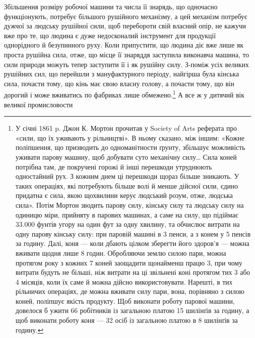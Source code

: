 Збільшення розміру робочої машини та числа її знарядь,
що одночасно функціонують, потребує більшого рушійного механізму,
а цей механізм потребує дужчої за людську рушійної сили,
щоб перебороти свій власний опір, не кажучи вже про те, що
людина є дуже недосконалий інструмент для продукції однорідного
й безупинного руху. Коли припустити, що людина діє
вже лише як проста рушійна сила, отже, що місце її знаряддя
заступила виконавча машина, то сили природи можуть тепер
заступити її і як рушійну силу. З-поміж усіх великих рушійних
сил, що перейшли з мануфактурного періоду, найгірша була
кінська сила, почасти тому, що кінь має свою власну голову,
а почасти тому, що він дорогий і може вживатись по фабриках
лише обмежено.\footnote{
У січні 1861 p. Джон К. Мортон прочитав у Society of Arts реферата
про «сили, що їх уживають у рільництві». В ньому сказано, між
іншим: «Кожне поліпшення, що призводить до одноманітности ґрунту,
збільшує можливість уживати парову машину, щоб добувати суто механічну
силу\dots{} Сила коней потрібна там, де покручені горожі й інші перешкоди
утруднюють одностайний рух. З кожним днем ці перешкоди щораз
більше зникають. У таких операціях, які потребують більше волі й менше
дійсної сили, єдино придатна є сила, якою щохвилини керує людський
розум, отже, людська сила». Потім Мортон зводить парову силу, кінську
силу та людську силу на одиницю міри, прийняту в парових машинах,
а саме на силу, що підіймає \num{33.000} фунтів угору на один фут за одну хвилину,
та обчислює витрати на одну парову кінську силу: при паровій
машині в 3 пенси, а з конем у 5 пенсів за годину. Далі, коня — коли
дбають цілком зберегти його здоров’я — можна вживати щодня лише
8 годин. Обробляючи землю силою пари, можна протягом року з кожних
7 коней заощадити щонайменш працю 3, при чому витрати будуть не
більші, ніж витрати на ці звільнені коні протягом тих 3 або 4 місяців,
коли їх саме й можна дійсно використовувати. Нарешті, в тих рільничих
операціях, де можна вживати силу пари, вона, порівняно з силою коней,
поліпшує якість продукту. Щоб виконати роботу парової машини, довелося
б ужити 66 робітників із загальною платою 15 шилінґів за годину,
а щоб виконати роботу коня — 32 осіб із загальною платою в 8 шилінґів
за годину.
} А все ж у дитячий вік великої промисловости
\parbreak{}  %
